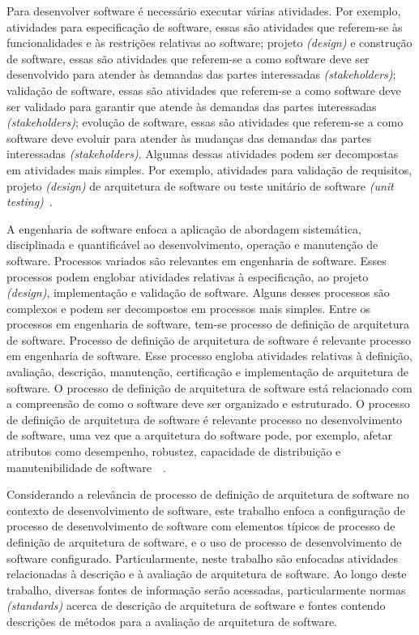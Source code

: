 Para desenvolver software é necessário executar várias atividades. Por exemplo, atividades para especificação de software, essas são atividades que referem-se às funcionalidades e às restrições relativas ao software; projeto \emph{(design)} e construção de software, essas são atividades que referem-se a como software deve ser desenvolvido para atender às demandas das partes interessadas \emph{(stakeholders)}; validação de software, essas são atividades que referem-se a como software deve ser validado para garantir que atende às demandas das partes interessadas \emph{(stakeholders)}; evolução de software, essas são atividades que referem-se a como software deve evoluir para atender às mudanças das demandas das partes interessadas \emph{ (stakeholders)}. Algumas dessas atividades podem ser decompostas em atividades mais simples. Por exemplo, atividades para validação de requisitos,  projeto \emph{(design)} de arquitetura de software ou teste unitário de software \emph{(unit testing)}~\cite{Sommerville_2011_texbook}.

A engenharia de software enfoca a aplicação de abordagem sistemática, disciplinada e quantificável ao desenvolvimento, operação e manutenção de software. Processos variados são relevantes em engenharia de software. Esses processos podem englobar atividades relativas à especificação, ao projeto \emph{(design)},  implementação e validação de software. Alguns desses processos são complexos e podem ser decompostos em processos mais simples. Entre os processos em engenharia de software, tem-se processo de definição de arquitetura de software. Processo de definição de arquitetura de software é relevante processo em engenharia de software. Esse processo engloba atividades relativas à definição, avaliação, descrição, manutenção, certificação e implementação de arquitetura de software. O processo de definição de arquitetura de software está relacionado com a compreensão de como o software deve ser organizado e estruturado. O processo de definição de arquitetura de software é relevante processo no desenvolvimento de software, uma vez que a arquitetura do software pode, por exemplo, afetar atributos como desempenho, robustez, capacidade de distribuição e manutenibilidade de software~\cite{Sommerville_2011_texbook}~\cite{Swebok}. 

Considerando a relevância de processo de definição de arquitetura de software no contexto de desenvolvimento de software, este trabalho enfoca a configuração de processo de desenvolvimento de software com elementos típicos de processo de definição de arquitetura de software, e o uso de processo de desenvolvimento de software configurado. Particularmente, neste trabalho são enfocadas atividades relacionadas à descrição e à avaliação de arquitetura de software. Ao longo deste trabalho, diversas fontes de informação serão acessadas, particularmente normas \emph{(standards)}  acerca de descrição de arquitetura de software e fontes contendo descrições de métodos para a avaliação de arquitetura de software.

